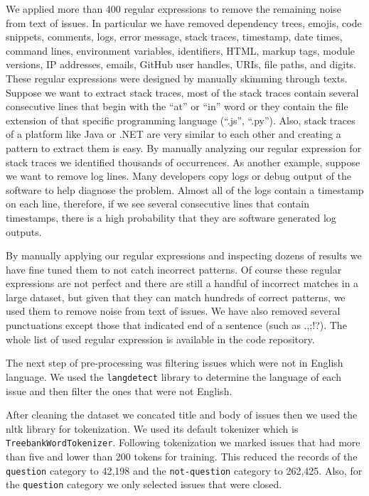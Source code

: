 \documentclass[conference]{IEEEtran}
\begin{document}
We applied more than 400 regular expressions to remove the remaining noise from text of issues. In 
particular we have removed dependency trees, emojis, code snippets, comments, logs,
error message, stack traces, timestamp, date times, command lines, environment variables, identifiers,
HTML, markup tags, module versions, IP addresses, emails, GitHub user handles, URIs, file paths, and digits.
These regular expressions were designed by manually skimming through texts. Suppose we want to extract
stack traces, most of the stack traces contain several consecutive lines that begin with 
the ``at'' or ``in'' word or they contain the file extension of that specific 
programming language (``.js'', ``.py''). Also, stack traces of a platform like Java or .NET are 
very similar to each other and creating a pattern to extract them is easy.
By manually analyzing our regular expression for stack traces we identified thousands
of occurrences. As another example, suppose we want to remove log lines. Many developers copy logs or debug
output of the software to help diagnose the problem. Almost all of the logs contain a timestamp on
each line, therefore, if we see several consecutive lines that contain timestamps, there is 
a high probability that they are software generated log outputs.

By manually applying our regular expressions and inspecting dozens of results we have fine tuned 
them to not catch incorrect patterns. Of course these regular expressions are not perfect and there are 
still a handful of incorrect matches in a large dataset, but given that they can match hundreds of correct patterns, 
we used them to remove noise from text of issues. We have also removed several punctuations except 
those that indicated end of a sentence (such as .,;!?). The whole list of used regular expression is available
in the code repository.

The next step of pre-processing was filtering issues which were not in English language. We used 
the \verb|langdetect| \cite{web:langdetect} library to determine the language of each issue 
and then filter the ones that were not English.

After cleaning the dataset we concated title and body of issues then we used the nltk library for 
tokenization. We used its default tokenizer which is \verb|TreebankWordTokenizer|. Following 
tokenization we marked issues that had more than five and lower than 200 tokens for training. 
This reduced the records of the \verb|question| category 
to 42,198 and the \verb|not-question| category to 262,425. Also, for the \verb|question| category we only selected
issues that were closed. 
\end{document}
